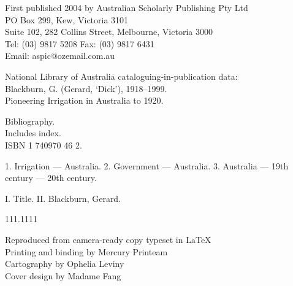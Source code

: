 \documentclass[11pt,b5paper,titlepage]{book}
\newcommand{\clearemptydoublepage}{\newpage{\pagestyle{empty}\cleardoublepage}}
\renewcommand{\headrulewidth}{0pt}%
\begin{document}
\begin{titlepage}
\begin{raggedright}
\medskip
First published 2004 by Australian Scholarly Publishing Pty Ltd\\
PO Box 299, Kew, Victoria 3101\\
Suite 102, 282 Collins Street, Melbourne, Victoria 3000\\
Tel: (03) 9817 5208 \quad Fax: (03) 9817 6431\\
Email: aspic@ozemail.com.au


\bigskip
National Library of Australia cataloguing-in-publication data:\\

\medskip
Blackburn, G. (Gerard, `Dick'), 1918--1999.\\
Pioneering Irrigation in Australia to 1920.\\
\begin{list}{}{\setlength{\topsep}{0ex}\setlength{\itemsep}{0ex}\setlength{\leftmargin}{2.5ex}}
\item
Bibliography.\\
Includes index.\\
ISBN 1 740970 46 2.

\item
1. Irrigation --- Australia. 2. Government --- Australia. 3. Australia
   --- 19th century --- 20th century.

\item
I. Title. II. Blackburn, Gerard.

\end{list}
111.1111

\medskip
Reproduced from camera-ready copy typeset in \LaTeX\\
Printing and binding by Mercury Printeam\\
Cartography by Ophelia Leviny\\
Cover design by Madame Fang

\end{raggedright}
\clearemptydoublepage

\end{titlepage}

\pagestyle{plain}
\begin{spacing}{0.93}
\tableofcontents
\end{spacing}
\newpage


\clearemptydoublepage

\clearemptydoublepage

\mainmatter
\pagestyle{fancy}
\renewcommand{\headrulewidth}{0.4pt}
\fancyhead[LE,RO]{\sffamily \small \thepage}
\fancyfoot{}
\end{document}
